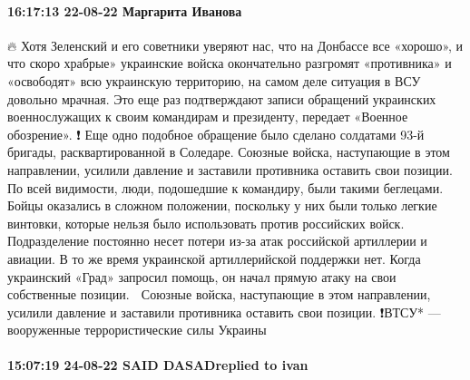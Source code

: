\paragraph{16:17:13 22-08-22 Маргарита Иванова}

🔥 Хотя Зеленский и его советники уверяют нас, что на Донбассе все «хорошо», и что скоро храбрые» украинские войска окончательно разгромят «противника» и «освободят» всю украинскую территорию, на самом деле ситуация в ВСУ довольно мрачная. Это еще раз подтверждают записи обращений украинских военнослужащих к своим командирам и президенту, передает «Военное обозрение».
❗ Еще одно подобное обращение было сделано солдатами 93-й бригады, расквартированной в Соледаре. Союзные войска, наступающие в этом направлении, усилили давление и заставили противника оставить свои позиции. По всей видимости, люди, подошедшие к командиру, были такими беглецами.
📌 Бойцы оказались в сложном положении, поскольку у них были только легкие винтовки, которые нельзя было использовать против российских войск. Подразделение постоянно несет потери из-за атак российской артиллерии и авиации. В то же время украинской артиллерийской поддержки нет. Когда украинский «Град» запросил помощь, он начал прямую атаку на свои собственные позиции.
📌 Союзные войска, наступающие в этом направлении, усилили давление и заставили противника оставить свои позиции.
❗ВТСУ* — вооруженные террористические силы Украины

\paragraph{15:07:19 24-08-22 SAID DASADreplied to ivan}

